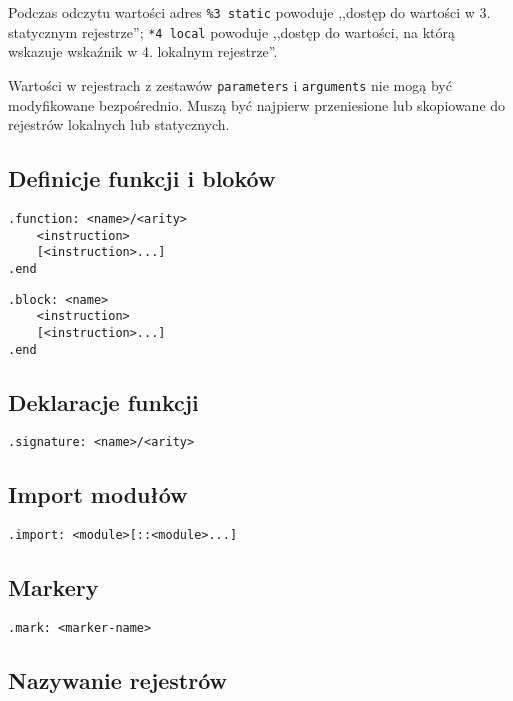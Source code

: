 Podczas odczytu wartości adres \texttt{\%3 static} powoduje ,,dostęp do wartości w 3. statycznym rejestrze'';
\texttt{*4 local} powoduje ,,dostęp do wartości, na którą wskazuje wskaźnik w 4. lokalnym rejestrze''.

Wartości w rejestrach z zestawów \texttt{parameters} i \texttt{arguments} nie mogą być modyfikowane
bezpośrednio. Muszą być najpierw przeniesione lub skopiowane do rejestrów lokalnych lub statycznych.

\subsection{Definicje funkcji i bloków}

\begin{lstlisting}
.function: <name>/<arity>
	<instruction>
	[<instruction>...]
.end
\end{lstlisting}

\begin{lstlisting}
.block: <name>
	<instruction>
	[<instruction>...]
.end
\end{lstlisting}

\subsection{Deklaracje funkcji}

\begin{lstlisting}
.signature: <name>/<arity>
\end{lstlisting}

\subsection{Import modułów}
\label{appendix_viua_vm_assembly_language_dir_import}

\begin{lstlisting}
.import: <module>[::<module>...]
\end{lstlisting}

\subsection{Markery}

\begin{lstlisting}
.mark: <marker-name>
\end{lstlisting}

\subsection{Nazywanie rejestrów}

